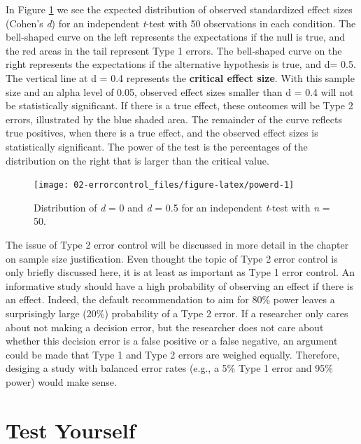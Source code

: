 \documentclass[
  oneside]{book}
\begin{document}
In Figure \ref{fig:powerd} we see the expected distribution of observed standardized effect sizes (Cohen's \emph{d}) for an independent \emph{t}-test with 50 observations in each condition. The bell-shaped curve on the left represents the expectations if the null is true, and the red areas in the tail represent Type 1 errors. The bell-shaped curve on the right represents the expectations if the alternative hypothesis is true, and d= 0.5. The vertical line at d = 0.4 represents the \textbf{critical effect size}. With this sample size and an alpha level of 0.05, observed effect sizes smaller than d = 0.4 will not be statistically significant. If there is a true effect, these outcomes will be Type 2 errors, illustrated by the blue shaded area. The remainder of the curve reflects true positives, when there is a true effect, and the observed effect sizes is statistically significant. The power of the test is the percentages of the distribution on the right that is larger than the critical value.



\begin{figure}

{\centering \texttt{[image: 02-errorcontrol\_files/figure-latex/powerd-1]} 

}

\caption{Distribution of \emph{d} = 0 and \emph{d} = 0.5 for an independent \emph{t}-test with \emph{n} = 50.}\label{fig:powerd}
\end{figure}

The issue of Type 2 error control will be discussed in more detail in the chapter on sample size justification. Even thought the topic of Type 2 error control is only briefly discussed here, it is at least as important as Type 1 error control. An informative study should have a high probability of observing an effect if there is an effect. Indeed, the default recommendation to aim for 80\% power leaves a surprisingly large (20\%) probability of a Type 2 error. If a researcher only cares about not making a decision error, but the researcher does not care about whether this decision error is a false positive or a false negative, an argument could be made that Type 1 and Type 2 errors are weighed equally. Therefore, desiging a study with balanced error rates (e.g., a 5\% Type 1 error and 95\% power) would make sense.

\hypertarget{test-yourself-1}{%
\section{Test Yourself}\label{test-yourself-1}}
\end{document}
